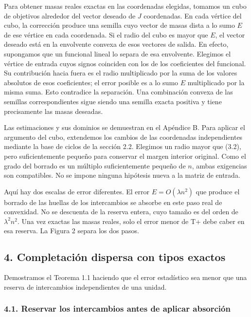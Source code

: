 \documentclass[spanish,11pt,a4paper]{article}
\begin{document}
Para obtener masas reales exactas en las coordenadas elegidas, tomamos un cubo de objetivos alrededor del vector deseado de \(J\) coordenadas. En cada vértice del cubo, la corrección produce una semilla cuyo vector de masas dista a lo sumo \(E\) de ese vértice en cada coordenada. Si el radio del cubo es mayor que \(E\), el vector deseado está en la envolvente convexa de esos vectores de salida. En efecto, supongamos que un funcional lineal lo separa de esa envolvente. Elegimos el vértice de entrada cuyos signos coinciden con los de los coeficientes del funcional. Su contribución hacia fuera es el radio multiplicado por la suma de los valores absolutos de esos coeficientes; el error posible es a lo sumo \(E\) multiplicado por la misma suma. Esto contradice la separación. Una combinación convexa de las semillas correspondientes sigue siendo una semilla exacta positiva y tiene precisamente las masas deseadas.

Las estimaciones y sus dominios se demuestran en el Apéndice B. Para aplicar el argumento del cubo, extendemos los cambios de las coordenadas independientes mediante la base de ciclos de la sección 2.2. Elegimos un radio mayor que (3.2), pero suficientemente pequeño para conservar el margen interior original. Como el grado del borrado es un múltiplo suficientemente pequeño de \(n\), ambas exigencias son compatibles. No se impone ninguna hipótesis nueva a la matriz de entrada.

Aquí hay dos escalas de error diferentes. El error \(E=O(\lambda n^2)\) que produce el borrado de las huellas de los intercambios se absorbe en este paso real de convexidad. No se descuenta de la reserva entera, cuyo tamaño es del orden de \(\lambda^2n^2\). Una vez exactas las masas reales, solo el error menor de T+ debe caber en esa reserva. La Figura 2 separa los dos pasos.

\subsection{4. Completación dispersa con tipos exactos}\label{completaciuxf3n-dispersa-con-tipos-exactos}

Demostramos el Teorema 1.1 haciendo que el error estadístico sea menor que una reserva de intercambios independientes de una unidad.

\subsubsection{4.1. Reservar los intercambios antes de aplicar absorción}\label{reservar-los-intercambios-antes-de-aplicar-absorciuxf3n}
\end{document}

